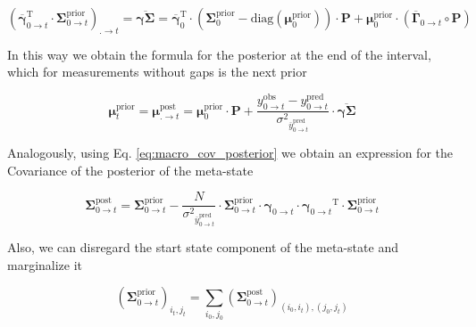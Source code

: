\documentclass[pdflatex,sn-mathphys-num]{sn-jnl}%
\theoremstyle{thmstyleone}%
\theoremstyle{thmstyletwo}%
\theoremstyle{thmstylethree}%
\begin{document}
\begin{equation}
	\left(\overline{\boldsymbol{\gamma}}^{\mathrm{T}}_{0 \rightarrow t} \cdot \boldsymbol{\Sigma}^{\mathrm{prior}}_{0 \rightarrow t} \right)_{. \rightarrow t} =\overline{\boldsymbol{\gamma} \boldsymbol{\Sigma}}= 
	\overline{\boldsymbol{\gamma}}_{0}^{\mathrm{T}} \cdot 
	\left( \boldsymbol{\Sigma}^{\mathrm{prior}}_{0} - \mathrm{diag}(\boldsymbol{\mu}^{\mathrm{prior}}_0) \right) \cdot \boldsymbol{P} 
	+ \boldsymbol{\mu}^{\mathrm{prior}}_0 \cdot \left( \overline{\boldsymbol{\Gamma}}_{0 \rightarrow t} \circ \boldsymbol{P} \right)
	\label{eq:interval_gamma_sigma}
\end{equation}

In this way we obtain the formula for the posterior at the end of the interval, which for measurements without gaps is the next prior


\begin{equation}
	\boldsymbol{\mu}^{\mathrm{prior}}_{t} = \boldsymbol{\mu}^{\mathrm{post}}_{. \rightarrow t} = \boldsymbol{\mu}^{\mathrm{prior}}_0 \cdot \boldsymbol{P} + 
	\frac{y^{\mathrm{obs}}_{0 \rightarrow t} - y^{\mathrm{pred}}_{0 \rightarrow t}}{{\sigma^2}_{\overline{y}^{\mathrm{pred}}_{0 \rightarrow t}}} 
	\cdot \overline{\boldsymbol{\gamma} \boldsymbol{\Sigma}}
	\label{eq:macro_interval_posterior_mean}
\end{equation}

Analogously, using Eq. \ref{eq:macro_cov_posterior} we obtain an expression for the Covariance of the posterior of the meta-state


\begin{equation}
	\boldsymbol{\Sigma}^{\mathrm{post}}_{0 \rightarrow t} = \boldsymbol{\Sigma}^{\mathrm{prior}}_{0 \rightarrow t} - 
	\frac{N}{{\sigma^2}_{\overline{y}^{\mathrm{pred}}_{0 \rightarrow t}}} \cdot \boldsymbol{\Sigma}^{\mathrm{prior}}_{0 \rightarrow t} \cdot \boldsymbol{\gamma}_{0 \rightarrow t} \cdot 
	{\boldsymbol{\gamma}_{0 \rightarrow t}}^{\mathrm{T}} \cdot \boldsymbol{\Sigma}^{\mathrm{prior}}_{0 \rightarrow t}
	\label{eq:posterior_covariance_update_0_t}
\end{equation}

Also, we can disregard the start state component of the meta-state and marginalize it 


\begin{equation}
	(\boldsymbol{\Sigma}^{\mathrm{prior}}_{0 \rightarrow t})_{i_{t}, j_{t}} = \sum_{i_{0}, j_{0}} (\boldsymbol{\Sigma}^{\mathrm{post}}_{0 \rightarrow t})_{(i_{0}, i_{t}), (j_{0}, j_{t})}
	\label{eq:prior_covariance_marginalization}
\end{equation}
\end{document}
